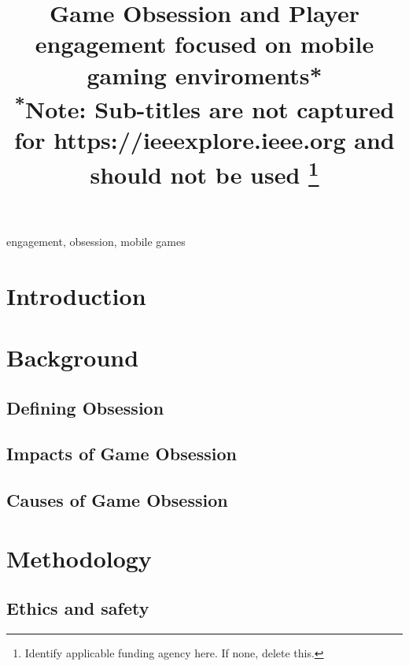 \documentclass[conference]{IEEEtran}
\begin{document}
\title{Game Obsession and Player engagement focused on mobile gaming enviroments*\\
{\footnotesize \textsuperscript{*}Note: Sub-titles are not captured for https://ieeexplore.ieee.org  and
should not be used}
\thanks{Identify applicable funding agency here. If none, delete this.}
}

\author{
}

\maketitle



\begin{abstract}

\end{abstract}

\begin{IEEEkeywords}
engagement, obsession, mobile games
\end{IEEEkeywords}

\section{Introduction}

\section{Background}
\subsection{Defining Obsession}
\subsection{Impacts of Game Obsession}
\subsection{Causes of Game Obsession}

\section{Methodology}
\subsection{Ethics and safety}
\end{document}
